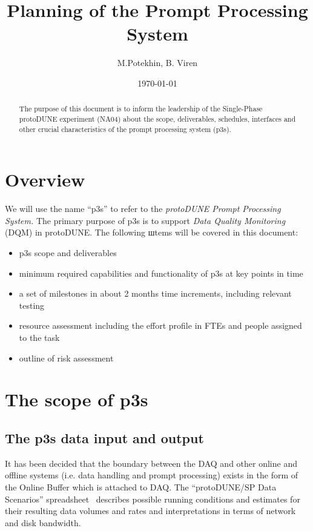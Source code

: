 \documentclass[pdftex,12pt,letter]{article}
\title{Planning of the \pd Prompt Processing System}
\date{\today}
\author{M.Potekhin, B. Viren}
\newcommand{\pd}{protoDUNE\xspace}
\begin{document}

\maketitle

\begin{abstract}
\noindent The purpose of this document is to inform the leadership
of the Single-Phase \pd experiment (NA04) about the scope, deliverables,
schedules, interfaces and other crucial characteristics of the prompt processing
system (p3s).
\end{abstract}


\pagebreak

\section{Overview}
We will use the name ``p3s'' to refer to the \textit{\pd Prompt Processing System.}
The primary purpose of p3s is to support \textit{Data Quality Monitoring} (DQM) in \pd.
The following шtems will be covered in this document:
\begin{itemize}
\item p3s scope and deliverables
\item minimum required capabilities and functionality of p3s at key points in time 

\item a set of milestones in about 2 months time increments, including relevant testing

\item resource assessment including the effort profile in FTEs and people assigned to the task

\item outline of risk assessment 
\end{itemize}


\section{The scope of p3s}
\subsection{The p3s data input and output}
It has been decided that the boundary between the DAQ and other online and
offline systems
(i.e. data handling and prompt processing) exists in the form of the Online Buffer
which is attached to DAQ. 
The ``\pd/SP Data Scenarios'' spreadsheet~\cite{docdb1086}
describes  possible running conditions and estimates for their
resulting data volumes and rates and interpretations in terms of
network and disk bandwidth. 
\end{document}
